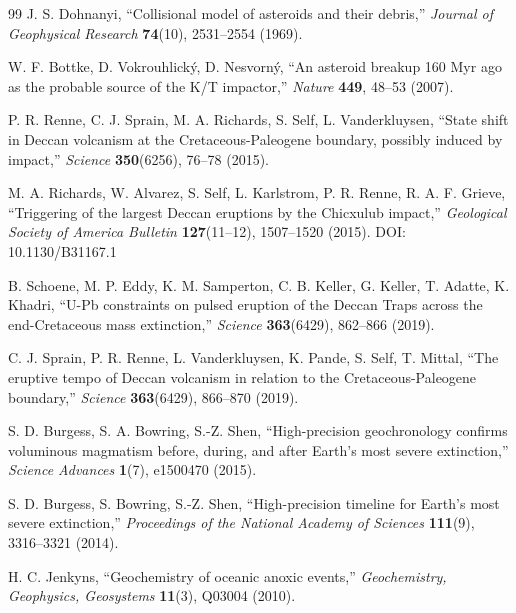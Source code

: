 \documentclass[11pt,a4paper]{article}
\begin{document}
\begin{thebibliography}{99}
		J. S. Dohnanyi, ``Collisional model of asteroids and their debris,''
		\emph{Journal of Geophysical Research} \textbf{74}(10), 2531–2554 (1969).
		
		W. F. Bottke, D. Vokrouhlický, D. Nesvorný, ``An asteroid breakup 160 Myr ago as the probable source of the K/T impactor,''
		\emph{Nature} \textbf{449}, 48–53 (2007).
		
		P. R. Renne, C. J. Sprain, M. A. Richards, S. Self, L. Vanderkluysen, ``State shift in Deccan volcanism at the Cretaceous-Paleogene boundary, possibly induced by impact,''
		\emph{Science} \textbf{350}(6256), 76–78 (2015).
		
		M. A. Richards, W. Alvarez, S. Self, L. Karlstrom, P. R. Renne, R. A. F. Grieve, ``Triggering of the largest Deccan eruptions by the Chicxulub impact,''
		\emph{Geological Society of America Bulletin} \textbf{127}(11–12), 1507–1520 (2015). DOI: 10.1130/B31167.1
		
		B. Schoene, M. P. Eddy, K. M. Samperton, C. B. Keller, G. Keller, T. Adatte, K. Khadri, ``U-Pb constraints on pulsed eruption of the Deccan Traps across the end-Cretaceous mass extinction,''
		\emph{Science} \textbf{363}(6429), 862–866 (2019).
		
		C. J. Sprain, P. R. Renne, L. Vanderkluysen, K. Pande, S. Self, T. Mittal, ``The eruptive tempo of Deccan volcanism in relation to the Cretaceous-Paleogene boundary,''
		\emph{Science} \textbf{363}(6429), 866–870 (2019).
		
		S. D. Burgess, S. A. Bowring, S.-Z. Shen, ``High-precision geochronology confirms voluminous magmatism before, during, and after Earth's most severe extinction,''
		\emph{Science Advances} \textbf{1}(7), e1500470 (2015).
		
		S. D. Burgess, S. Bowring, S.-Z. Shen, ``High-precision timeline for Earth's most severe extinction,''
		\emph{Proceedings of the National Academy of Sciences} \textbf{111}(9), 3316–3321 (2014).
		
		H. C. Jenkyns, ``Geochemistry of oceanic anoxic events,''
		\emph{Geochemistry, Geophysics, Geosystems} \textbf{11}(3), Q03004 (2010).
		

\end{thebibliography}
\end{document}
